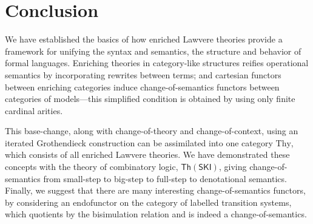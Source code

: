 \documentclass{amsart}
\theoremstyle{definition}
\newcommand{\Th}{\mathsf{Th}}
\begin{document}
\section{Conclusion}
\label{sec:conclusion}

We have established the basics of how enriched Lawvere theories provide a framework for unifying the syntax and semantics, the structure and behavior of formal languages. Enriching theories in category-like structures reifies operational semantics by incorporating rewrites between terms; and cartesian functors between enriching categories induce change-of-semantics functors between categories of models---this simplified condition is obtained by using only finite cardinal arities.

This base-change, along with change-of-theory and change-of-context, using an iterated Grothendieck construction can be assimilated into one category $\mathrm{Thy}$, which consists of all enriched Lawvere theories. We have demonstrated these concepts with the theory of combinatory logic, $\Th(\mathsf{SKI})$, giving change-of-semantics from small-step to big-step to full-step to denotational semantics. Finally, we suggest that there are many interesting change-of-semantics functors, by considering an endofunctor on the category of labelled transition systems, which quotients by the bisimulation relation and is indeed a change-of-semantics.
\end{document}
